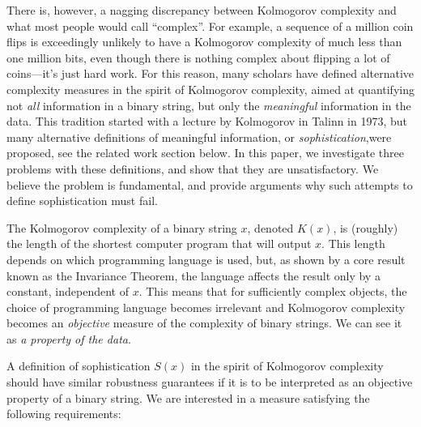 \documentclass{style/llncs}
\begin{document}
There is, however, a nagging discrepancy between Kolmogorov complexity and what most people would call ``complex''. For example, a sequence of a million coin flips is exceedingly unlikely to have a Kolmogorov complexity of much less than one million bits, even though there is nothing complex about flipping a lot of coins---it's just hard work. For this reason, many scholars have defined alternative complexity measures in the spirit of Kolmogorov complexity, aimed at quantifying not \emph{all} information in a binary string, but only the \emph{meaningful} information in the data. This tradition started with a lecture by Kolmogorov in Talinn in 1973, but many alternative definitions of meaningful information, or \emph{sophistication},\footnotemark were proposed, see the related work section below. In this paper, we investigate three problems with these definitions, and show that they are unsatisfactory. We believe the problem is fundamental, and provide arguments why such attempts to define sophistication must fail.


The Kolmogorov complexity of a binary string $x$, denoted $K(x)$, is (roughly) the length of the shortest computer program that will output $x$. This length depends on which programming language is used, but, as shown by a core result known as the Invariance Theorem, the language affects the result only by a constant, independent of $x$. This means that for sufficiently complex objects, the choice of programming language becomes irrelevant and Kolmogorov complexity becomes an \emph{objective} measure of the complexity of binary strings. We can see it as \emph{a property of the data}.

A definition of sophistication $S(x)$ in the spirit of Kolmogorov complexity should have similar robustness guarantees if it is to be interpreted as an objective property of a binary string. We are interested in a measure satisfying the following requirements:
\end{document}
